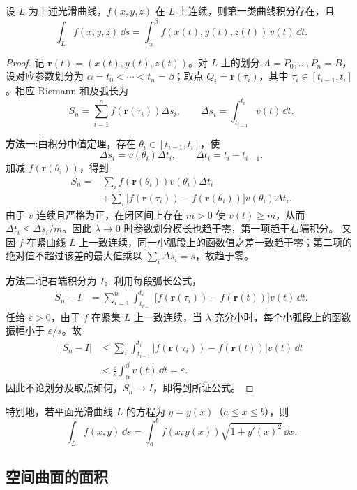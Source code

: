 \begin{theorem}
设 $L$ 为上述光滑曲线，$f(x,y,z)$ 在 $L$ 上连续，则第一类曲线积分存在，且
\[
\int_L f(x,y,z)\,\dd s
=\int_\alpha^\beta f(x(t),y(t),z(t))\,v(t)\,\dd t.
\]
\end{theorem}
\begin{proof}
记 $\boldsymbol r(t)=(x(t),y(t),z(t))$。对 $L$ 上的划分 $A=P_0,\ldots,P_n=B$，设对应参数划分为 $\alpha=t_0<\cdots<t_n=\beta$；取点 $Q_i=\boldsymbol r(\tau_i)$，其中 $\tau_i\in[t_{i-1},t_i]$。相应 Riemann 和及弧长为
\[
S_n=\sum_{i=1}^n f(\boldsymbol r(\tau_i))\Delta s_i,\qquad
\Delta s_i=\int_{t_{i-1}}^{t_i}v(t)\,\dd t.
\]

\textbf{方法一:}由积分中值定理，存在 $\theta_i\in[t_{i-1},t_i]$，使
\[
\Delta s_i=v(\theta_i)\Delta t_i,\qquad \Delta t_i=t_i-t_{i-1}.
\]
加减 $f(\boldsymbol r(\theta_i))$，得到
\[
\begin{aligned}
S_n={}&\sum_i f(\boldsymbol r(\theta_i))v(\theta_i)\Delta t_i\\
&+\sum_i\bigl[f(\boldsymbol r(\tau_i))-f(\boldsymbol r(\theta_i))\bigr]v(\theta_i)\Delta t_i.
\end{aligned}
\]
由于 $v$ 连续且严格为正，在闭区间上存在 $m>0$ 使 $v(t)\ge m$，从而 $\Delta t_i\le\Delta s_i/m$。因此 $\lambda\to0$ 时参数划分模长也趋于零，第一项趋于右端积分。
又因 $f$ 在紧曲线 $L$ 上一致连续，同一小弧段上的函数值之差一致趋于零；第二项的绝对值不超过该差的最大值乘以 $\sum_i\Delta s_i=s$，故趋于零。

\textbf{方法二:}记右端积分为 $I$。利用每段弧长公式，
\[
\begin{aligned}
S_n-I
&=\sum_{i=1}^n\int_{t_{i-1}}^{t_i}
\bigl[f(\boldsymbol r(\tau_i))-f(\boldsymbol r(t))\bigr]v(t)\,\dd t.
\end{aligned}
\]
任给 $\varepsilon>0$，由于 $f$ 在紧集 $L$ 上一致连续，当 $\lambda$ 充分小时，每个小弧段上的函数振幅小于 $\varepsilon/s$。故
\[
\begin{aligned}
|S_n-I|
&\le\sum_i\int_{t_{i-1}}^{t_i}
|f(\boldsymbol r(\tau_i))-f(\boldsymbol r(t))|v(t)\,\dd t\\
&<\frac{\varepsilon}{s}\int_\alpha^\beta v(t)\,\dd t=\varepsilon.
\end{aligned}
\]
因此不论划分及取点如何，$S_n\to I$，即得到所证公式。
\end{proof}

特别地，若平面光滑曲线 $L$ 的方程为 $y=y(x)$（$a\le x\le b$），则
\[
\int_Lf(x,y)\,\dd s
=\int_a^bf(x,y(x))\sqrt{1+y'(x)^2}\,\dd x.
\]

\subsection*{空间曲面的面积}

